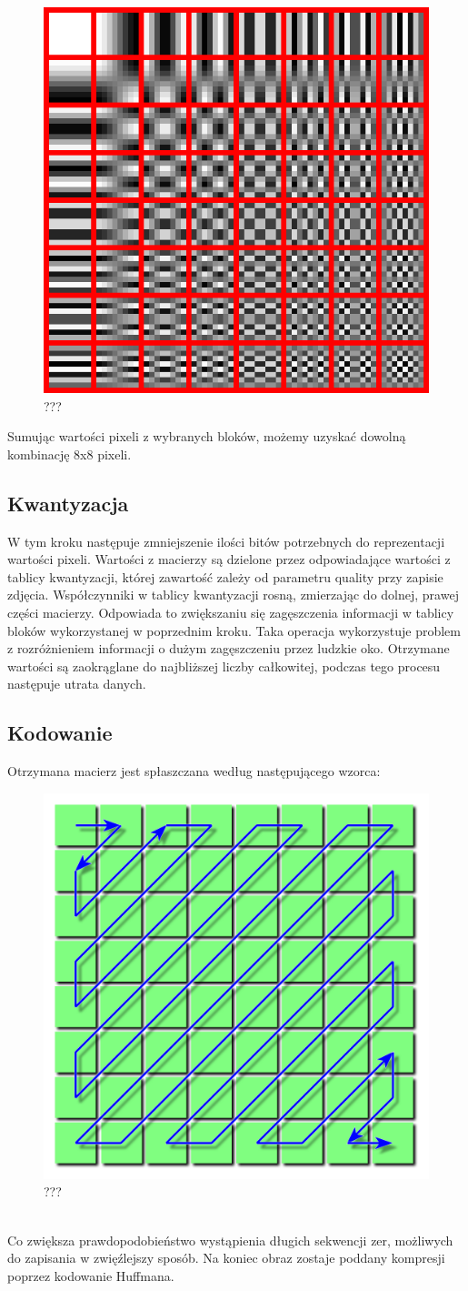 \documentclass[a4paper,11pt]{article}
\begin{document}
\begin{figure}[h!]
	\begin{center}
	\includegraphics[width=0.5\columnwidth]{DCT.png}
	\caption{???}
\end{center}
\end{figure}
Sumując wartości pixeli z wybranych bloków, możemy uzyskać dowolną kombinację 8x8 pixeli.
\subsection{Kwantyzacja}
W tym kroku następuje zmniejszenie ilości bitów potrzebnych do reprezentacji wartości pixeli.
Wartości z macierzy są dzielone przez odpowiadające wartości z tablicy kwantyzacji,
której zawartość zależy od parametru quality przy zapisie zdjęcia. Współczynniki w tablicy kwantyzacji rosną, zmierzając do dolnej, prawej części macierzy.
Odpowiada to zwiększaniu się zagęszczenia informacji w tablicy bloków wykorzystanej w poprzednim kroku.
Taka operacja wykorzystuje problem z rozróżnieniem informacji o dużym zagęszczeniu przez ludzkie oko.
Otrzymane wartości są zaokrąglane do najbliższej liczby całkowitej, podczas tego procesu następuje utrata danych.
\subsection{Kodowanie}
Otrzymana macierz jest spłaszczana według następującego wzorca:
\begin{figure}[h!]
	\begin{center}
	\includegraphics[width=0.5\columnwidth]{pattern.png}
	\caption{???}
\end{center}
\end{figure}
\\
Co zwiększa prawdopodobieństwo wystąpienia długich sekwencji zer, możliwych do zapisania w zwięźlejszy sposób.
Na koniec obraz zostaje poddany kompresji poprzez kodowanie Huffmana.
\newpage
\end{document}
